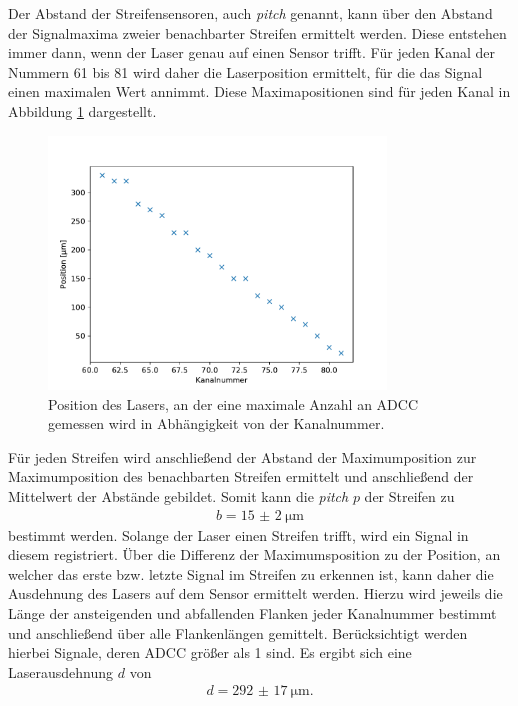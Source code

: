Der Abstand der Streifensensoren, auch \textit{pitch} genannt, kann über den Abstand der Signalmaxima zweier benachbarter Streifen ermittelt werden. Diese entstehen immer dann, wenn der Laser genau auf einen Sensor trifft. Für jeden Kanal der Nummern 61 bis 81 wird daher die Laserposition ermittelt, für die das Signal einen maximalen Wert annimmt. Diese Maximapositionen sind für jeden Kanal in Abbildung \ref{fig:Maxima} dargestellt.
\begin{figure}
  \centering
  \includegraphics[width=0.8\textwidth]{plots/Maxima.pdf}
  \caption{Position des Lasers, an der eine maximale Anzahl an ADCC gemessen wird in Abhängigkeit von der Kanalnummer.}
  \label{fig:Maxima}
\end{figure}
\FloatBarrier
Für jeden Streifen wird anschließend der Abstand der Maximumposition zur Maximumposition des benachbarten Streifen ermittelt und anschließend der Mittelwert der Abstände gebildet.
Somit kann die \textit{pitch} $p$ der Streifen zu
\begin{align*}
  b = \SI{15(2)}{\micro\metre}
\end{align*}
bestimmt werden.
Solange der Laser einen Streifen trifft, wird ein Signal in diesem registriert. Über die Differenz der Maximumsposition zu der Position, an welcher das erste bzw. letzte Signal im Streifen zu erkennen ist, kann daher die Ausdehnung des Lasers auf dem Sensor ermittelt werden. Hierzu wird jeweils die Länge der ansteigenden und abfallenden Flanken jeder Kanalnummer bestimmt und anschließend über alle Flankenlängen gemittelt. Berücksichtigt werden hierbei Signale, deren ADCC größer als 1 sind. Es ergibt sich eine Laserausdehnung $d$ von
\begin{align*}
  d = \SI{292(17)}{\micro\metre}.
\end{align*}


